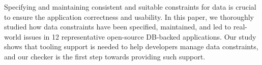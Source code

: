 \label{sec:con}
Specifying and maintaining
consistent and suitable constraints for data is crucial to ensure the application correctness and usability.
In this paper, we thoroughly studied how data constraints have been specified, maintained, and led to
real-world issues in 12 representative open-source DB-backed applications. Our study shows that
tooling support is needed to help developers manage data constraints, and our checker is the first step towards providing such support.